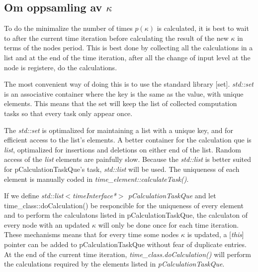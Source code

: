 \subsection{Om oppsamling av $\kappa$}
\label{secCalcultaionTaskQue}
To do the minimalize the number of times $p(\kappa)$ is calculated, it is best to wait to after the current time iteration before calculating the result of the new $\kappa$ in terms of the nodes period.
This is best done by collecting all the calculations in a list and at the end of the time iteration, after all the change of input level at the node is registere, do the calculations.

The most convenient way of doing this is to use the standard library [set]. %
\emph{std::set} is an associative container where the key is the same as the value, with unique elements. %
This means that the set will keep the list of collected computation tasks so that every task only appear once.

The \emph{std::set} is optimalized for maintaining a list with a unique key, and for efficient access to the list's elements. 
A better container for the calculation que is \emph{list}, optimalized for insertions and deletions on either end of the list. Random access of the \emph{list} elements are painfully slow\cite{Stroustrup2000KAP17}.
Because the \emph{std::list} is better suited for pCalculationTaskQue's task, \emph{std::list} will be used.
The uniqueness of each element is manually coded in \emph{time\_element::calculateTask()}.

If we define \emph{std::list$<$timeInterface*$>$ pCalculationTaskQue} and let time\_class::doCalculation() be responcible for the uniqueness of every element and to perform the calculatons listed in pCalculationTaskQue, 
	the calculaton of every node with an updated $\kappa$ will only be done once for each time iteration.
These mechanisms means that for every time some nodes $\kappa$ is updated, a [\emph{this}] pointer can be added to pCalculationTaskQue without fear of duplicate entries. 
At the end of the current time iteration, \emph{time\_class.doCalculation()} will perform the calculations required by the elements listed in \emph{pCalculationTaskQue}.    %




